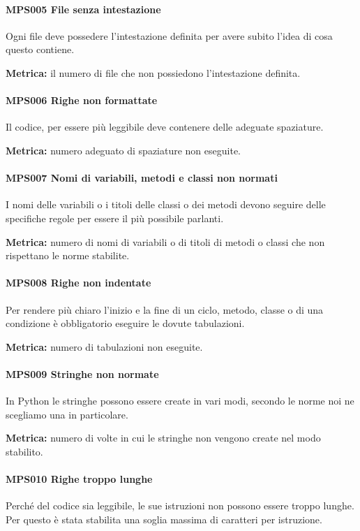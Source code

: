         \paragraph{MPS005 File senza intestazione}
        Ogni file deve possedere l'intestazione definita per avere subito l'idea di cosa questo contiene.

        \textbf{Metrica:} il numero di file che non possiedono l'intestazione definita.

        \paragraph{MPS006 Righe non formattate}
        Il codice, per essere più leggibile deve contenere delle adeguate spaziature.

        \textbf{Metrica:} numero adeguato di spaziature non eseguite.

        \paragraph{MPS007 Nomi di variabili, metodi e classi non normati}
        I nomi delle variabili o i titoli delle classi o dei metodi devono seguire delle specifiche regole per essere il più possibile parlanti.

        \textbf{Metrica:} numero di nomi di variabili o di titoli di metodi o classi che non rispettano le norme stabilite.

        \paragraph{MPS008 Righe non indentate}
        Per rendere più chiaro l'inizio e la fine di un ciclo, metodo, classe
        o di una condizione è obbligatorio eseguire le dovute tabulazioni.

        \textbf{Metrica:} numero di tabulazioni non eseguite.

        \paragraph{MPS009 Stringhe non normate}
        In Python le stringhe possono essere create in vari modi, secondo le norme noi ne scegliamo una in particolare.

        \textbf{Metrica:} numero di volte in cui le stringhe non vengono create nel modo stabilito.

        \paragraph{MPS010 Righe troppo lunghe}
        Perché del codice sia leggibile, le sue istruzioni non possono essere troppo lunghe. Per questo è stata stabilita una soglia massima di caratteri per istruzione.

